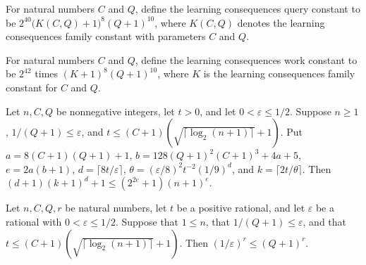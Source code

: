 \begin{definition}
\label{FABL.learningConsequencesQueryConstant}
\leanok
{}
For natural numbers $C$ and $Q$, define the learning consequences query constant to be
$2^{40}\bigl(K(C,Q)+1\bigr)^8(Q+1)^{10}$, where $K(C,Q)$ denotes the learning
consequences family constant with parameters $C$ and $Q$.
\end{definition}

\begin{definition}
\label{FABL.learningConsequencesWorkConstant}
\leanok
{}
For natural numbers $C$ and $Q$, define the learning consequences work constant to be
$2^{42}$ times $(K+1)^8(Q+1)^{10}$, where $K$ is the learning consequences family
constant for $C$ and $Q$.
\end{definition}

\begin{theorem}
\label{FABL.learningConsequencesFamilyBound_add_one_le_fixed_power}
\leanok
{}
Let $n,C,Q$ be nonnegative integers, let $t>0$, and let $0<\varepsilon\leq1/2$. Suppose
$n\geq1$, $1/(Q+1)\leq\varepsilon$, and $t\leq(C+1)(\sqrt{\lceil\log_2(n+1)\rceil}+1)$.
Put $a=8(C+1)(Q+1)+1$, $b=128(Q+1)^2(C+1)^3+4a+5$, $e=2a(b+1)$,
$d=\lceil8t/\varepsilon\rceil$, $\theta=(\varepsilon/8)^2t^{-2}(1/9)^d$, and
$k=\lceil2t/\theta\rceil$. Then $(d+1)(k+1)^d+1\leq(2^{2e}+1)(n+1)^e$.
\end{theorem}

\begin{theorem}
\label{FABL.one_div_accuracy_pow_le}
\leanok
{}
Let $n,C,Q,r$ be natural numbers, let $t$ be a positive rational, and let $\varepsilon$
be a rational with $0<\varepsilon\le 1/2$. Suppose that $1\le n$, that
$1/(Q+1)\le\varepsilon$, and that $t\le (C+1)(\sqrt{\lceil\log_2(n+1)\rceil}+1)$. Then
$(1/\varepsilon)^r\le (Q+1)^r$.
\end{theorem}

